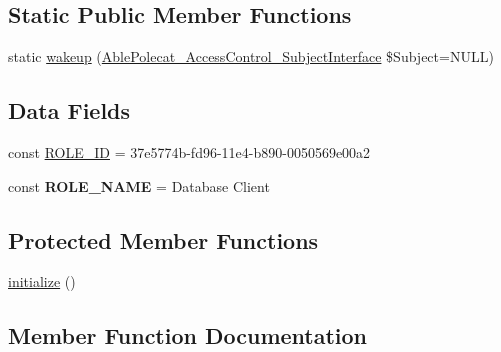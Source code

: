 \subsection*{Static Public Member Functions}
\begin{DoxyCompactItemize}
\item 
static \hyperlink{class_able_polecat___access_control___role___client___database_a3f2135f6ad45f51d075657f6d20db2cd}{wakeup} (\hyperlink{interface_able_polecat___access_control___subject_interface}{Able\+Polecat\+\_\+\+Access\+Control\+\_\+\+Subject\+Interface} \$Subject=N\+U\+L\+L)
\end{DoxyCompactItemize}
\subsection*{Data Fields}
\begin{DoxyCompactItemize}
\item 
const \hyperlink{class_able_polecat___access_control___role___client___database_a26e65ac69fe81338080fb11db5e43752}{R\+O\+L\+E\+\_\+\+I\+D} = \textquotesingle{}37e5774b-\/fd96-\/11e4-\/b890-\/0050569e00a2\textquotesingle{}
\item 
\hypertarget{class_able_polecat___access_control___role___client___database_a34c510d39f596673190fd018be4f1db9}{}const {\bfseries R\+O\+L\+E\+\_\+\+N\+A\+M\+E} = \textquotesingle{}Database Client\textquotesingle{}\label{class_able_polecat___access_control___role___client___database_a34c510d39f596673190fd018be4f1db9}

\end{DoxyCompactItemize}
\subsection*{Protected Member Functions}
\begin{DoxyCompactItemize}
\item 
\hyperlink{class_able_polecat___access_control___role___client___database_a91098fa7d1917ce4833f284bbef12627}{initialize} ()
\end{DoxyCompactItemize}


\subsection{Member Function Documentation}
\hypertarget{class_able_polecat___access_control___role___client___database_a91098fa7d1917ce4833f284bbef12627}{}
